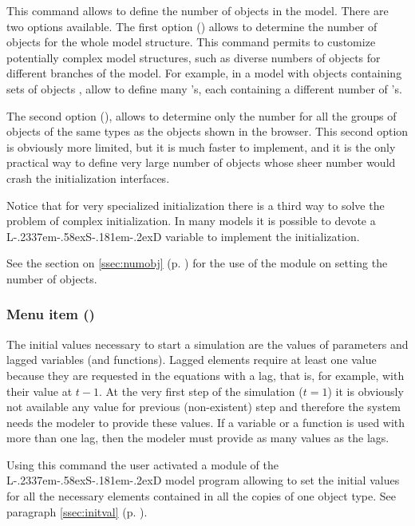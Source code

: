 \documentclass [11pt,a4paper] {book}
\def\LsD{{L\kern-.2337em\lower-.58ex\hbox{S}\kern-.181em\lower-.2ex\hbox{D}}\xspace}
\begin{document}
This command allows to define the number of objects in the model. There are two options available. The first option () allows to determine the number of objects for the whole model structure. This command permits to customize potentially complex model structures, such as diverse numbers of objects for different branches of the model. For example, in a model with objects  containing sets of objects , allow to define many 's, each containing a different number of 's.

The second option (), allows to determine only the number for all the groups of objects of the same types as the objects shown in the browser. This second option is obviously more limited, but it is much faster to implement, and it is the only practical way to define very large number of objects whose sheer number would crash the initialization interfaces.

Notice that for very specialized initialization there is a third way to solve the problem of complex initialization. In many models it is possible to devote a \LsD variable to implement the initialization.

See the section on \ref{ssec:numobj} (p. \pageref{ssec:numobj})  for the use of the module on setting the number of objects.


\subsubsection{Menu item  ()}


The initial values necessary to start a simulation are the values of parameters and lagged variables (and functions). Lagged elements require at least one value because they are requested in the equations with a lag, that is, for example, with their value at $t-1$. At the very first step of the simulation ($t=1$) it is obviously not available any value for previous (non-existent) step and therefore the system needs the modeler to provide these values. If a variable or a function is used with more than one lag, then the modeler must provide as many values as the lags. 

Using this command the user activated a module of the \LsD model program allowing to set the initial values for all the necessary elements contained in all the copies of one object type. See paragraph \ref{ssec:initval} (p. \pageref{ssec:initval}).
\end{document}
